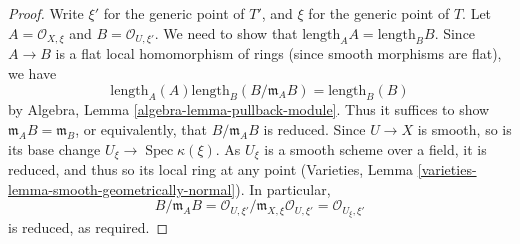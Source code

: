 \documentclass[10pt,a4paper]{amsart}
\theoremstyle{plain}
\theoremstyle{definition}
\theoremstyle{remark}
\numberwithin{equation}{subsection}
\def\Spec{\mathop{\mathrm{Spec}}}
\begin{document}
\begin{proof}
Write $\xi'$ for the generic point of $T'$, and $\xi$ for the
generic point of $T$. Let $A = \mathcal{O}_{X, \xi}$ and
$B = \mathcal{O}_{U, \xi'}$. We need to show that
$\text{length}_A A = \text{length}_B B$. Since
$A \to B$ is a flat local homomorphism of rings
(since smooth morphisms are flat), we have
$$
\text{length}_A(A) \text{length}_B(B/\mathfrak m_A B) =
\text{length}_B(B)
$$
by Algebra, Lemma \ref{algebra-lemma-pullback-module}. Thus it suffices
to show $\mathfrak m_A B = \mathfrak m_B$, or equivalently, that
$B/\mathfrak m_A B$ is reduced. Since $U \to X$ is smooth,
so is its base change $U_{\xi} \to \Spec \kappa(\xi)$. As $U_{\xi}$ is a
smooth scheme over a field, it is reduced, and thus so its local ring
at any point
(Varieties, Lemma \ref{varieties-lemma-smooth-geometrically-normal}).
In particular,
$$
B/\mathfrak m_A B =
\mathcal{O}_{U, \xi'}/\mathfrak m_{X, \xi}\mathcal{O}_{U, \xi'} =
\mathcal{O}_{U_\xi, \xi'}
$$
is reduced, as required.
\end{proof}
\end{document}
